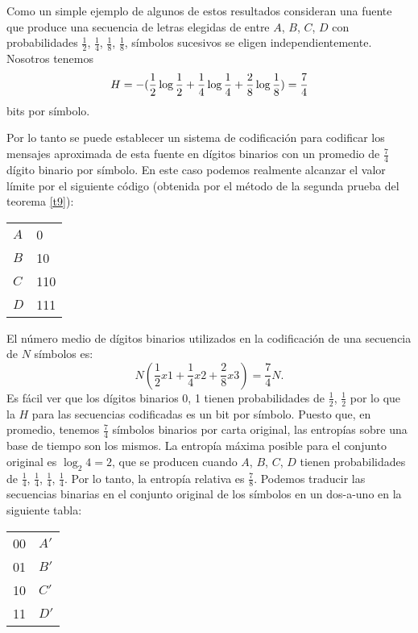 Como un simple ejemplo de algunos de estos resultados consideran una
fuente que produce una secuencia de letras elegidas de entre $A$, $B$,
$C$, $D$ con probabilidades $\frac{1}{2}$, $\frac{1}{4}$,
$\frac{1}{8}$, $\frac{1}{8}$, s\'imbolos sucesivos se eligen
independientemente. Nosotros tenemos
\begin{equation}
H = -(\frac{1}{2} \log \frac{1}{2} + \frac{1}{4} \log \frac{1}{4} + \frac{2}{8} \log \frac{1}{8})\\
= \frac{7}{4}
\end{equation}
bits por s\'imbolo.

Por lo tanto se puede establecer un sistema de codificaci\'on para
codificar los mensajes aproximada de esta fuente en d\'igitos binarios
con un promedio de $\frac{7}{4}$ d\'igito binario por s\'imbolo. En
este caso podemos realmente alcanzar el valor l\'imite por el
siguiente c\'odigo (obtenida por el m\'etodo de la segunda prueba del
teorema \ref{t9}):

\begin{tabular}{ll}
 $A$ & 0 \\
 $B$ & 10\\
 $C$ & 110\\
 $D$ & 111
\end{tabular}

El n\'umero medio de d\'igitos binarios utilizados en la codificaci\'on de una secuencia de $N$ s\'imbolos es:
\begin{equation}
N (\frac{1}{2} x 1 + \frac{1}{4} x 2 + \frac{2}{8} x 3) = \frac{7}{4}N.
\end{equation}
Es f\'acil ver que los d\'igitos binarios 0, 1 tienen probabilidades
de $\frac{1}{2}$, $\frac{1}{2}$ por lo que la $H$ para las secuencias
codificadas es un bit por s\'imbolo. Puesto que, en promedio, tenemos
$\frac{7}{4}$ s\'imbolos binarios por carta original, las entrop\'ias
sobre una base de tiempo son los mismos. La entrop\'ia m\'axima
posible para el conjunto original es $\log_2 4 = 2$, que se producen
cuando $A$, $B$, $C$, $D$ tienen probabilidades
de $\frac{1}{4}$, $\frac{1}{4}$, $\frac{1}{4}$, $\frac{1}{4}$. Por lo tanto,
la entrop\'ia relativa es $\frac{7}{8}$. Podemos traducir las secuencias
binarias en el conjunto original de los s\'imbolos en un dos-a-uno en
la siguiente tabla:

\begin{tabular}{ll}
00  &	$A'$\\
01	&	$B'$\\
10	&	$C'$\\
11	&	$D'$\\
\end{tabular}

